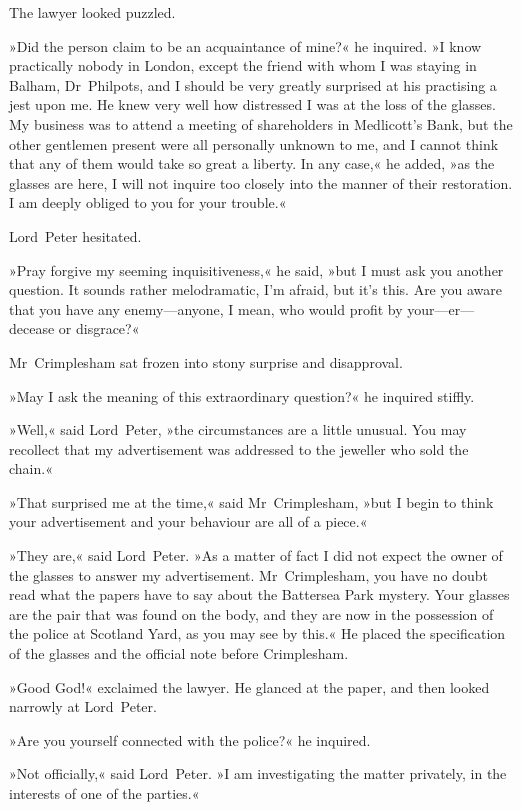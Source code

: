The lawyer looked puzzled.

»Did the person claim to be an acquaintance of mine?« he inquired. »I know practically nobody in London, except the friend with whom I was staying in Balham, Dr~Philpots, and I should be very greatly surprised at his practising a jest upon me. He knew very well how distressed I was at the loss of the glasses. My business was to attend a meeting of shareholders in Medlicott's Bank, but the other gentlemen present were all personally unknown to me, and I cannot think that any of them would take so great a liberty. In any case,« he added, »as the glasses are here, I will not inquire too closely into the manner of their restoration. I am deeply obliged to you for your trouble.«

Lord~Peter hesitated.

»Pray forgive my seeming inquisitiveness,« he said, »but I must ask you another question. It sounds rather melodramatic, I'm afraid, but it's this. Are you aware that you have any enemy—anyone, I mean, who would profit by your—er—decease or disgrace?«

Mr~Crimplesham sat frozen into stony surprise and disapproval.

»May I ask the meaning of this extraordinary question?« he inquired stiffly.

»Well,« said Lord~Peter, »the circumstances are a little unusual. You may recollect that my advertisement was addressed to the jeweller who sold the chain.«

»That surprised me at the time,« said Mr~Crimplesham, »but I begin to think your advertisement and your behaviour are all of a piece.«

»They are,« said Lord~Peter. »As a matter of fact I did not expect the owner of the glasses to answer my advertisement. Mr~Crimplesham, you have no doubt read what the papers have to say about the Battersea Park mystery. Your glasses are the pair that was found on the body, and they are now in the possession of the police at Scotland Yard, as you may see by this.« He placed the specification of the glasses and the official note before Crimplesham.

»Good God!« exclaimed the lawyer. He glanced at the paper, and then looked narrowly at Lord~Peter.

»Are you yourself connected with the police?« he inquired.

»Not officially,« said Lord~Peter. »I am investigating the matter privately, in the interests of one of the parties.«

